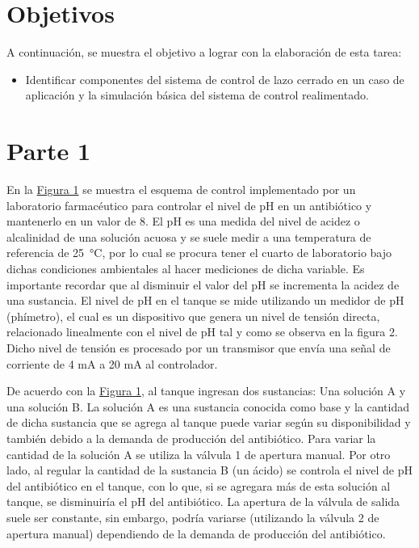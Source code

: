 \section*{Objetivos}

A continuación, se muestra el objetivo a lograr con la elaboración de esta tarea:
\begin{itemize}
    \item Identificar componentes del sistema de control de lazo cerrado en un caso
de aplicación y la simulación básica del sistema de control realimentado.
\end{itemize}

\section*{Parte 1}

\hspace{1.27cm} En la \hyperref[fig1]{Figura 1} se muestra el esquema de control implementado por un laboratorio farmacéutico para controlar el nivel de pH en un antibiótico y mantenerlo en un valor de 8.
El pH es una medida del nivel de acidez o alcalinidad de una solución acuosa y se suele medir a una temperatura de referencia de \SI{25}{\celsius}, por lo cual se procura tener el cuarto de laboratorio bajo dichas condiciones ambientales al hacer mediciones de dicha variable. 
Es importante recordar que al disminuir el valor del pH se incrementa la acidez de una sustancia. 
El nivel de pH en el tanque se mide utilizando un medidor de pH (phímetro), el cual es un dispositivo que genera un nivel de tensión directa, relacionado linealmente con el nivel de pH tal y como se observa en la figura 2. 
Dicho nivel de tensión es procesado por un transmisor que envía una señal de corriente de 4 mA a 20 mA al controlador.

\hspace{1.27cm} De acuerdo con la \hyperref[fig1]{Figura 1}, al tanque ingresan dos sustancias: Una solución A y una solución B. 
La solución A es una sustancia conocida como base y la cantidad de dicha sustancia que se agrega al tanque puede variar según su disponibilidad y también debido a la demanda de producción del antibiótico. 
Para variar la cantidad de la solución A se utiliza la válvula 1 de apertura manual. Por otro lado, al regular la cantidad de la sustancia B (un ácido) se controla el nivel de pH del antibiótico en el tanque, con lo que, si se agregara más de esta solución al tanque, se disminuiría el pH del antibiótico. 
La apertura de la válvula de salida suele ser constante, sin embargo, podría variarse (utilizando la válvula 2 de apertura manual) dependiendo de la demanda de producción del antibiótico.

